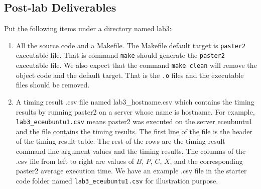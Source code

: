 \subsection{Post-lab Deliverables}
\label{sec:lab3:postlab}
Put the following items under a directory named lab3:
\begin{enumerate}
\item All the source code and a Makefile. The Makefile default target is \verb+paster2+ executable file. That is command \verb+make+ should generate the \verb+paster2+ executable file. We also expect that the command \verb+make clean+ will remove the object code and the default target. That is the \verb+.o+ files and the executable files should be removed.
\item A timing result .csv file named lab3\_hostname.csv 
  which contains the timing results by running paster2 on a server whose name is hostname. For example, \verb+lab3_eceubuntu1.csv+ means paster2 was executed on the server eceubuntu1 and the file contains the timing results.
  The first line of the file is the header of the timing result table. The rest of the rows are the timing result command line argument values and the timing results. The columns of the .csv file from left to right are values of $B$, $P$, $C$, $X$, and the corresponding paster2 average execution time. We have an example .csv file in the starter code folder named \verb+lab3_eceubuntu1.csv+ for illustration purpose.


\end{enumerate}
